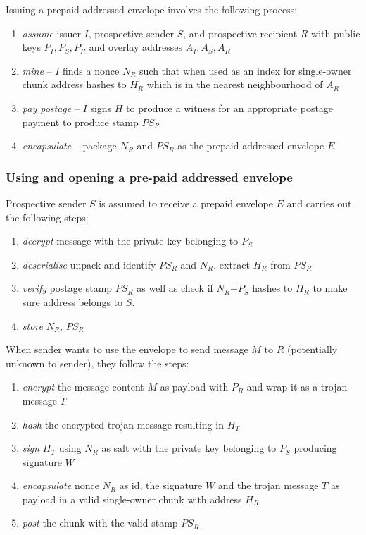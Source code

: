 Issuing a prepaid addressed envelope involves the following process:

\begin{enumerate}
\item \emph{assume} issuer $I$, prospective sender $S$, and prospective recipient $R$ with public keys $P_I, P_S, P_R$ and overlay addresses $A_I, A_S, A_R$
\item \emph{mine} -- $I$ finds a nonce $N_R$ such that when used as an index for single-owner chunk address hashes to $H_R$ which is in the nearest neighbourhood of $A_R$
\item \emph{pay postage} -- $I$ signs $H$ to produce a witness for an appropriate postage payment to produce stamp $PS_R$ 
\item \emph{encapsulate} -- package $N_R$ and $PS_R$ as the prepaid addressed envelope $E$ 
\end{enumerate}

\subsubsection{Using and opening a pre-paid addressed envelope}

Prospective sender $S$ is assumed to receive a prepaid envelope $E$ and carries out  the following steps:
\begin{enumerate}
    \item \emph{decrypt} message with the private key belonging to $P_S$
    \item \emph{deserialise} unpack and identify $PS_R$ and $N_R$, extract $H_R$ from $PS_R$
    \item \emph{verify} postage stamp $PS_R$ as well as check if $N_R$+$P_S$ hashes to $H_R$ to make sure address belongs to  $S$.
    \item \emph{store} $N_R$, $PS_R$ 
\end{enumerate}

When sender wants to use the envelope to send message $M$ to $R$ (potentially unknown to sender), they 
follow the steps:

\begin{enumerate}
\item \emph{encrypt} the message content $M$ as payload with $P_R$ and wrap it as a trojan message $T$
\item \emph{hash} the encrypted trojan message resulting in $H_T$
\item \emph{sign} $H_T$ using $N_R$ as salt with the private key belonging to $P_S$ producing signature $W$
\item \emph{encapsulate} nonce $N_R$ as id, the signature $W$ and the trojan message $T$ as payload in a valid single-owner chunk with address $H_R$
\item \emph{post} the chunk with the valid stamp $PS_R$
\end{enumerate}


